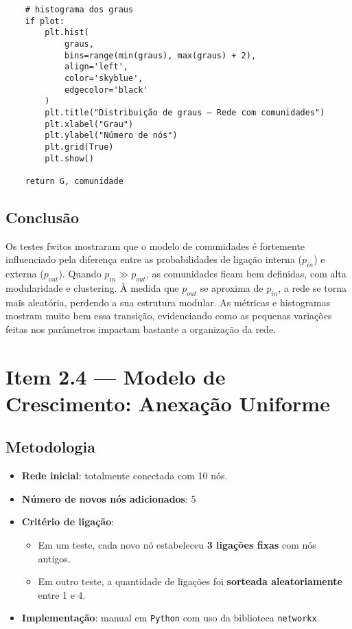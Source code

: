 \documentclass[a4paper]{article}
\begin{document}
\begin{verbatim}
    # histograma dos graus
    if plot:
        plt.hist(
            graus,
            bins=range(min(graus), max(graus) + 2),
            align='left',
            color='skyblue',
            edgecolor='black'
        )
        plt.title("Distribuição de graus — Rede com comunidades")
        plt.xlabel("Grau")
        plt.ylabel("Número de nós")
        plt.grid(True)
        plt.show()

    return G, comunidade

\end{verbatim}

\subsection*{Conclusão}

Os testes fwitos mostraram que o modelo de comunidades é fortemente influenciado pela diferença entre as probabilidades de ligação interna ($p_{in}$) e externa ($p_{out}$). Quando $p_{in} \gg p_{out}$, as comunidades ficam bem definidas, com alta modularidade e clustering. À medida que $p_{out}$ se aproxima de $p_{in}$, a rede se torna mais aleatória, perdendo a sua estrutura modular. As métricas e histogramas mostram muito bem essa transição, evidenciando como as pequenas variações feitas nos parâmetros impactam bastante a organização da rede.

\newpage

\section*{Item 2.4 — Modelo de Crescimento: Anexação Uniforme}


\subsection*{Metodologia}

\begin{itemize}
    \item \textbf{Rede inicial}: totalmente conectada com 10 nós.
    \item \textbf{Número de novos nós adicionados}: 5
    \item \textbf{Critério de ligação}:
    \begin{itemize}
        \item Em um teste, cada novo nó estabeleceu \textbf{3 ligações fixas} com nós antigos.
        \item Em outro teste, a quantidade de ligações foi \textbf{sorteada aleatoriamente} entre 1 e 4.
    \end{itemize}
    \item \textbf{Implementação}: manual em \texttt{Python} com uso da biblioteca \texttt{networkx}.
\end{itemize}
\end{document}
